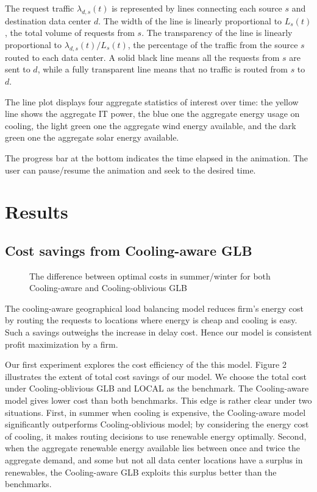 \documentclass{acm_proc_article-sp}
\begin{document}
The request traffic $\lambda_{d,s}(t)$ is represented by lines connecting each source $s$ and destination data center $d$. The width of the line is linearly proportional to $L_s(t)$, the total volume of requests from $s$. The transparency of the line is linearly proportional to ${\lambda_{d,s}(t)} / {L_s(t)}$, the percentage of the traffic from the source $s$ routed to each data center. A solid black line means all the requests from $s$ are sent to $d$, while a fully transparent line means that no traffic is routed from $s$ to $d$.

The line plot displays four aggregate statistics of interest over time: the yellow line shows the aggregate IT power, the blue one the aggregate energy usage on cooling, the light green one the aggregate wind energy available, and the dark green one the aggregate solar energy available.

The progress bar at the bottom indicates the time elapsed in the animation. The user can pause/resume the animation and seek to the desired time.


\section{Results}
\subsection{Cost savings from Cooling-aware GLB}

\begin{figure}
\centering
{}
\caption{The difference between optimal costs in summer/winter for both Cooling-aware and Cooling-oblivious GLB}
\end{figure}

The cooling-aware geographical load balancing model reduces firm's energy cost by routing the requests to locations where energy is cheap and cooling is easy. Such a savings outweighs the increase in delay cost. Hence our model is consistent profit maximization by a firm.


Our first experiment explores the cost efficiency of the this model. Figure 2 illustrates the extent of total cost savings of our model. We choose the total cost under Cooling-oblivious GLB and LOCAL as the benchmark. The Cooling-aware model gives lower cost than both benchmarks. This edge is rather clear under two situations. First, in summer when cooling is expensive, the Cooling-aware model significantly outperforms Cooling-oblivious model; by considering the energy cost of cooling, it makes routing decisions to use renewable energy optimally. Second, when the aggregate renewable energy available lies between once and twice the aggregate demand, and some but not all data center locations have a surplus in renewables, the Cooling-aware GLB exploits this surplus better than the benchmarks.
\end{document}
